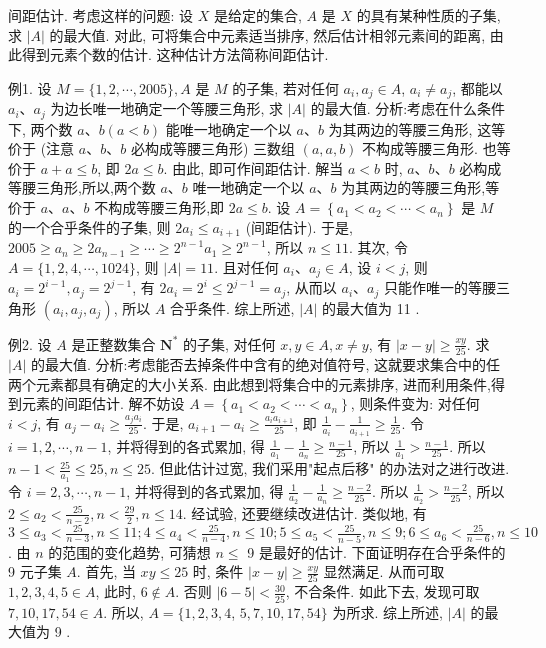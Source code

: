 
间距估计.
考虑这样的问题: 设 $X$ 是给定的集合, $A$ 是 $X$ 的具有某种性质的子集, 求 $|A|$ 的最大值.
对此, 可将集合中元素适当排序, 然后估计相邻元素间的距离, 由此得到元素个数的估计.
这种估计方法简称间距估计.



例1. 设 $M=\{1,2, \cdots, 2005\}, A$ 是 $M$ 的子集, 若对任何 $a_i, a_j \in A$, $a_i \neq a_j$, 都能以 $a_i 、 a_j$ 为边长唯一地确定一个等腰三角形, 求 $|A|$ 的最大值.
分析:考虑在什么条件下, 两个数 $a 、 b(a<b)$ 能唯一地确定一个以 $a 、 b$ 为其两边的等腰三角形, 这等价于 (注意 $a 、 b 、 b$ 必构成等腰三角形) 三数组 $(a, a, b)$ 不构成等腰三角形.
也等价于 $a+a \leqslant b$, 即 $2 a \leqslant b$. 由此, 即可作间距估计.
解当 $a<b$ 时, $a 、 b 、 b$ 必构成等腰三角形,所以,两个数 $a 、 b$ 唯一地确定一个以 $a 、 b$ 为其两边的等腰三角形,等价于 $a 、 a 、 b$ 不构成等腰三角形,即 $2 a \leqslant b$.
设 $A=\left\{a_1<a_2<\cdots<a_n\right\}$ 是 $M$ 的一个合乎条件的子集, 则 $2 a_i \leqslant a_{i+1}$ (间距估计). 于是, $2005 \geqslant a_n \geqslant 2 a_{n-1} \geqslant \cdots \geqslant 2^{n-1} a_1 \geqslant 2^{n-1}$, 所以 $n \leqslant 11$.
其次, 令 $A=\{1,2,4, \cdots, 1024\}$, 则 $|A|=11$. 且对任何 $a_i 、 a_j \in A$, 设 $i<j$, 则 $a_i=2^{i-1}, a_j=2^{j-1}$, 有 $2 a_i=2^i \leqslant 2^{j-1}=a_j$, 从而以 $a_i 、 a_j$ 只能作唯一的等腰三角形 $\left(a_i, a_j, a_j\right)$, 所以 $A$ 合乎条件.
综上所述, $|A|$ 的最大值为 11 .



例2. 设 $A$ 是正整数集合 $\mathbf{N}^*$ 的子集, 对任何 $x, y \in A, x \neq y$, 有 $\mid x- y \mid \geqslant \frac{x y}{25}$. 求 $|A|$ 的最大值.
分析:考虑能否去掉条件中含有的绝对值符号, 这就要求集合中的任两个元素都具有确定的大小关系.
由此想到将集合中的元素排序, 进而利用条件,得到元素的间距估计.
解不妨设 $A=\left\{a_1<a_2<\cdots<a_n\right\}$, 则条件变为: 对任何 $i<j$, 有 $a_j-a_i \geqslant \frac{a_j a_i}{25}$. 于是, $a_{i+1}-a_i \geqslant \frac{a_i a_{i+1}}{25}$, 即 $\frac{1}{a_i}-\frac{1}{a_{i+1}} \geqslant \frac{1}{25}$.
令 $i=1,2, \cdots, n-1$, 并将得到的各式累加, 得 $\frac{1}{a_1}-\frac{1}{a_n} \geqslant \frac{n-1}{25}$, 所以 $\frac{1}{a_1}>\frac{n-1}{25}$. 所以 $n-1<\frac{25}{a_1} \leqslant 25, n \leqslant 25$. 但此估计过宽, 我们采用"起点后移" 的办法对之进行改进.
令 $i=2,3, \cdots, n-1$, 并将得到的各式累加, 得 $\frac{1}{a_2}-\frac{1}{a_n} \geqslant \frac{n-2}{25}$. 所以 $\frac{1}{a_2}>\frac{n-2}{25}$, 所以 $2 \leqslant a_2<\frac{25}{n-2}, n<\frac{29}{2}, n \leqslant 14$. 经试验, 还要继续改进估计.
类似地, 有 $3 \leqslant a_3<\frac{25}{n-3}, n \leqslant 11 ; 4 \leqslant a_4<\frac{25}{n-4}, n \leqslant 10 ; 5 \leqslant a_5< \frac{25}{n-5}, n \leqslant 9 ; 6 \leqslant a_6<\frac{25}{n-6}, n \leqslant 10$. 由 $n$ 的范围的变化趋势, 可猜想 $n \leqslant$ 9 是最好的估计.
下面证明存在合乎条件的 9 元子集 $A$. 首先, 当 $x y \leqslant 25$ 时, 条件 $\mid x- y \mid \geqslant \frac{x y}{25}$ 显然满足.
从而可取 $1,2,3,4,5 \in A$, 此时, $6 \notin A$. 否则 $|6-5|< \frac{30}{25}$, 不合条件.
如此下去, 发现可取 $7,10,17,54 \in A$. 所以, $A=\{1,2,3,4$, $5,7,10,17,54\}$ 为所求.
综上所述, $|A|$ 的最大值为 9 .



